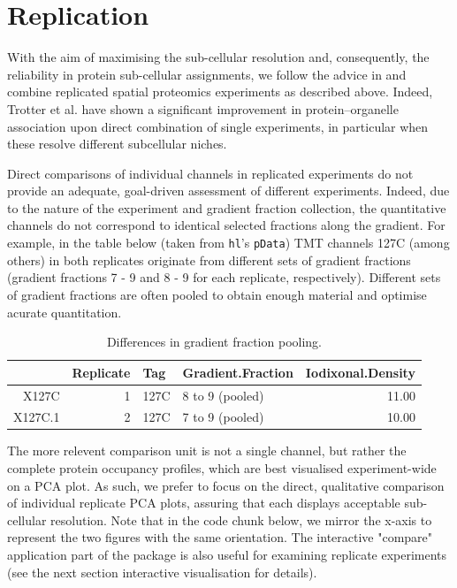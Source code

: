 \pagebreak

\section*{Replication}

With the aim of maximising the sub-cellular resolution and,
consequently, the reliability in protein sub-cellular assignments, we
follow the advice in \cite{Trotter:2010} and combine replicated spatial
proteomics experiments as described above. Indeed, Trotter et
al. have shown a significant improvement in protein–organelle
association upon direct combination of single experiments, in
particular when these resolve different subcellular niches.

Direct comparisons of individual channels in replicated experiments
do not provide an adequate, goal-driven assessment of different
experiments. Indeed, due to the nature of the experiment and gradient
fraction collection, the quantitative channels do not correspond to
identical selected fractions along the gradient. For example, in the
table below (taken from \texttt{hl}'s \texttt{pData}) TMT channels
127C (among others) in both replicates originate from different sets
of gradient fractions (gradient fractions 7 - 9 and 8 - 9 for each
replicate, respectively). Different sets of gradient fractions are
often pooled to obtain enough material and optimise acurate
quantitation.

\begin{table}[ht]
\centering
\begin{tabular}{rrllr}
  \hline
 & Replicate & Tag & Gradient.Fraction & Iodixonal.Density \\ 
  \hline
X127C &   1 & 127C & 8 to 9 (pooled) & 11.00 \\ 
  X127C.1 &   2 & 127C & 7 to 9 (pooled) & 10.00 \\ 
   \hline
\end{tabular}
\caption{Differences in gradient fraction pooling.} 
\label{tab:pdtab}
\end{table}


\pagebreak

The more relevent comparison unit is not a single channel, but rather
the complete protein occupancy profiles, which are best visualised 
experiment-wide on a PCA plot. As such, we prefer to focus on the
direct, qualitative comparison of individual replicate PCA plots,
assuring that each displays acceptable sub-cellular resolution. Note
that in the code chunk below, we mirror the x-axis to represent the
two figures with the same orientation. The interactive "compare"
application part of the  package is also useful for
examining replicate experiments (see the next section interactive
visualisation for details).

